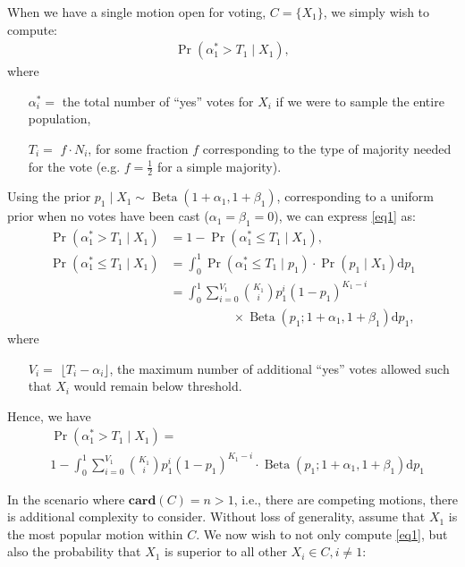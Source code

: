 \documentclass{sigchi}
\begin{document}
When we have a single motion open for voting, $C=\{X_1\}$, we simply wish to compute:
\begin{align}\label{eq1}
\Pr(\alpha^*_1 > T_1 \mid X_1),
\end{align}
where
\begin{description}
\begin{itemize}
\item[$\alpha^*_i = $] the total number of ``yes'' votes for $X_i$ if we were to sample the entire population,
\item[$T_i = $] $f \cdot N_i$, for some fraction $f$ corresponding to the type of majority needed for the vote
(e.g. $f=\frac{1}{2}$ for a simple majority).
\end{itemize}
\end{description}
Using the prior $p_1 \mid X_1 \sim \operatorname{Beta}(1+\alpha_1,1+\beta_1)$, corresponding to a uniform prior when
no votes have been cast ($\alpha_1 = \beta_1 = 0$), we can express \eqref{eq1} as:
\begin{align*}
\Pr(\alpha^*_1 > T_1 \mid X_1) &= 1 - \Pr(\alpha^*_1 \leq T_1 \mid X_1),\\
\Pr(\alpha^*_1 \leq T_1 \mid X_1) &= \int_0^1 \Pr(\alpha^*_1 \leq T_1 \mid p_1)\cdot \Pr(p_1 \mid X_1) \mathrm{d}p_1\\
&= \int_0^1 \sum\limits_{i=0}^{V_1} {K_1 \choose i} p_1^{i} {(1-p_1)}^{K_1-i} \\
& \qquad\qquad\quad \times \operatorname{Beta}(p_1; 1+\alpha_1,1+\beta_1) \mathrm{d}p_1,
\end{align*}
where
\begin{description}
\begin{itemize}
\item[$V_i = $] $\lfloor{T_i - \alpha_i}\rfloor$, the maximum number of additional ``yes'' votes allowed such that
$X_i$ would remain below threshold.
\end{itemize}
\end{description}

Hence, we have
\begin{align}\label{eq2}
& \Pr(\alpha^*_1 > T_1 \mid X_1) = \nonumber\\
& 1 - \int_0^1 \sum\limits_{i=0}^{V_1} {K_1 \choose i} p_1^{i} {(1-p_1)}^{K_1-i} \cdot \operatorname{Beta}(p_1; 1+\alpha_1,1+\beta_1) \mathrm{d}p_1
\end{align}

In the scenario where $\mathbf{card}(C) = n > 1$, i.e., there are competing motions, there is additional complexity to
consider.
Without loss of generality, assume that $X_1$ is the most popular motion within $C$.
We now wish to not only compute \eqref{eq1}, but also the probability that $X_1$ is superior to all other
$X_i  \in C, i \neq 1$:
\end{document}
